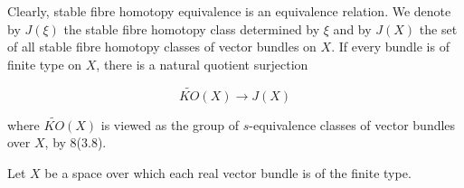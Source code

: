 Clearly, stable fibre homotopy equivalence is an equivalence relation. We denote by $J(\xi)$ the stable fibre homotopy class determined by $\xi$ and by $J(X)$ the set of all stable fibre homotopy classes of vector bundles on $X$. If every bundle is of finite type on $X$, there is a natural quotient surjection

$$\tilde{KO}(X) \rightarrow J(X)$$

where $\tilde{KO}(X)$ is viewed as the group of $s$-equivalence classes of vector bundles over $X$, by 8(3.8).

Let $X$ be a space over which each real vector bundle is of the finite type.
